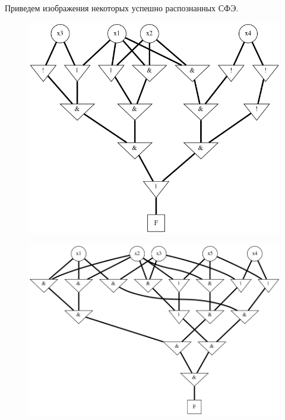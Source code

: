 \documentclass[makeidx, a4paper, 14pt]{extarticle}
\begin{document}
\newpage

Приведем изображения некоторых успешно распознанных СФЭ.

\begin{figure}[H]
    \centering
    \includegraphics[scale=0.45]{example1.png}
\end{figure}

\begin{figure}[H]
    \includegraphics[scale=0.5]{example4.png}
\end{figure}
\end{document}
